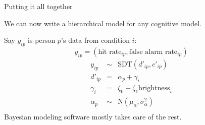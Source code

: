 \documentclass[aspectratio=169]{beamer}
\begin{document}
\begin{frame}[fragile]{Putting it all together}

    We can now write a hierarchical model for any cognitive model.\pause

    Say $y_{ip}$ is person $p$'s data from condition $i$: \pause$$y_{ip} = \left(\text{hit rate}_{ip}, \text{false alarm rate}_{ip}\right)$$\pause
    \begin{eqnarray*}
        y_{ip} &\sim& \text{SDT}(d'_{ip}, c'_{ip}) \\
        d'_{ip} &=& \alpha_{p} + \gamma_{i} \\
        \gamma_{i} &=& \zeta_{0} + \zeta_{1} \text{brightness}_{i} \\
        \alpha_{p} &\sim& \text{N}(\mu_{\alpha}, \sigma^2_{\alpha}) \\
    \end{eqnarray*}\pause
    Bayesian modeling software mostly takes care of the rest.
\end{frame}

\maketitle
\end{document}
